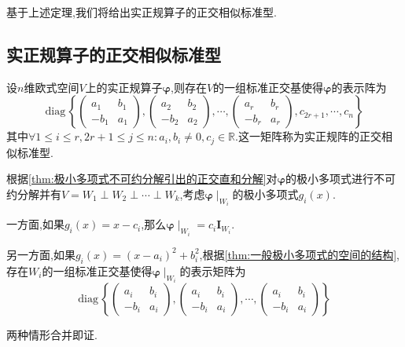 \vfill
\begin{red}
    \begin{remark}
        基于上述定理,我们将给出实正规算子的正交相似标准型.
    \end{remark}
\end{red}

\subsection{实正规算子的正交相似标准型}

\begin{formal}
    \begin{theorem}[实正规算子的正交相似标准型]\label{thm:实正规算子的正交相似标准型}
        设$n$维欧式空间$V$上的实正规算子$\bm{\varphi}$,则存在$V$的一组标准正交基使得$\bm{\varphi}$的表示阵为\[
        \mathrm{diag}\,\left\{
            \begin{pmatrix}
                a_1&b_1\\
                -b_1&a_1
            \end{pmatrix},\begin{pmatrix}
                a_2&b_2\\
                -b_2&a_2
            \end{pmatrix},\cdots,\begin{pmatrix}
                a_r&b_r\\
                -b_r&a_r
                \end{pmatrix},c_{2r+1},\cdots,c_n
        \right\}
        \]其中$\forall1\leqslant i\leqslant r,2r+1\leqslant j\leqslant n:a_i,b_i\neq0,c_j\in\mathbb{R}$.这一矩阵称为实正规阵的正交相似标准型.
    \end{theorem}
    \begin{Proof}
        根据\cref{thm:极小多项式不可约分解引出的正交直和分解}对$\bm{\varphi}$的极小多项式进行不可约分解并有$V=W_1\perp W_2\perp\cdots\perp W_k$,考虑$\bm{\varphi}\mid_{W_i}$的极小多项式$g_i\left(x\right)$.

        一方面,如果$g_i\left(x\right)=x-c_i$,那么$\bm{\varphi}\mid_{W_i}=c_i\bm{I}_{W_i}$.

        另一方面,如果$g_i\left(x\right)=\left(x-a_i\right)^2+b_i^2$,根据\cref{thm:一般极小多项式的空间的结构},存在$W_i$的一组标准正交基使得$\bm{\varphi}\mid_{W_i}$的表示矩阵为\[
        \mathrm{diag}\,\left\{
            \begin{pmatrix}
                a_i&b_i\\
                -b_i&a_i
            \end{pmatrix},\begin{pmatrix}
                a_i&b_i\\
                -b_i&a_i
            \end{pmatrix},\cdots,\begin{pmatrix}
                a_i&b_i\\
                -b_i&a_i
            \end{pmatrix}
        \right\}\]

        两种情形合并即证.
    \end{Proof}
\end{formal}
